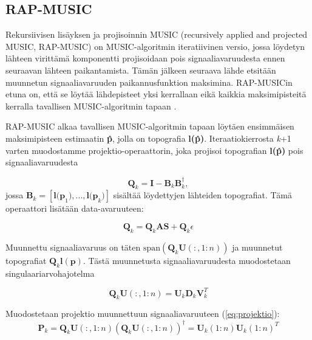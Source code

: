\subsection{RAP-MUSIC}
Rekursiivisen lisäyksen ja projisoinnin MUSIC (recursively applied and projected MUSIC, RAP-MUSIC) \citep{Mosher1999SourceMUSIC} on MUSIC-algoritmin iteratiivinen versio, jossa löydetyn lähteen virittämä komponentti projisoidaan pois signaaliavaruudesta ennen seuraavan lähteen paikantamista. Tämän jälkeen seuraava lähde etsitään muunnetun signaaliavaruuden paikannusfunktion maksimina. RAP-MUSICin etuna on, että se löytää lähdepisteet yksi kerrallaan eikä kaikkia maksimipisteitä kerralla tavallisen MUSIC-algoritmin tapaan \citep{Makela2018TruncatedLocalization}.


RAP-MUSIC alkaa tavallisen MUSIC-algoritmin tapaan löytäen ensimmäisen maksimipisteen estimaatin \textbf{\^p}, jolla on topografia \textbf{l(\^p)}. Iteraatiokierrosta \textit{k}+1 varten muodostamme projektio-operaattorin, joka projisoi topografian \textbf{l(\^p)} pois signaaliavaruudesta

\begin{equation}
    \mathbf{Q}_k = \mathbf{I}-\mathbf{B}_k\mathbf{B}_k^\dagger,
\end{equation}
jossa $\mathbf{B}_k = [\mathbf{l(p}_1),...,\mathbf{l(p}_{k})]$ sisältää löydettyjen lähteiden topografiat. Tämä operaattori lisätään data-avaruuteen:

\begin{equation}
    \mathbf{Q}_k = \mathbf{Q}_k\mathbf{AS}+\mathbf{Q}_k\epsilon
\end{equation}

Muunnettu signaaliavaruus on täten $\text{span}(\mathbf{Q}_k\mathbf{U}(:,1:n))$ ja muunnetut topografiat $\mathbf{Q}_k\mathbf{l(p)}$. Tästä muunnetusta signaaliavaruudesta muodostetaan singulaariarvohajotelma

\begin{equation}
    \mathbf{Q}_k\mathbf{U}(:,1:n) = \mathbf{U}_k\mathbf{D}_k\mathbf{V}_k^T
\end{equation}

Muodostetaan projektio muunnettuun signaaliavaruuteen (\ref{eq:projektio}):
\begin{equation}
    \mathbf{P}_k = \mathbf{Q}_k\mathbf{U}(:,1:n)(\mathbf{Q}_k\mathbf{U}(:,1:n))^{\dagger} = \mathbf{U}_k(1:n)\mathbf{U}_k(1:n)^T
\end{equation}

